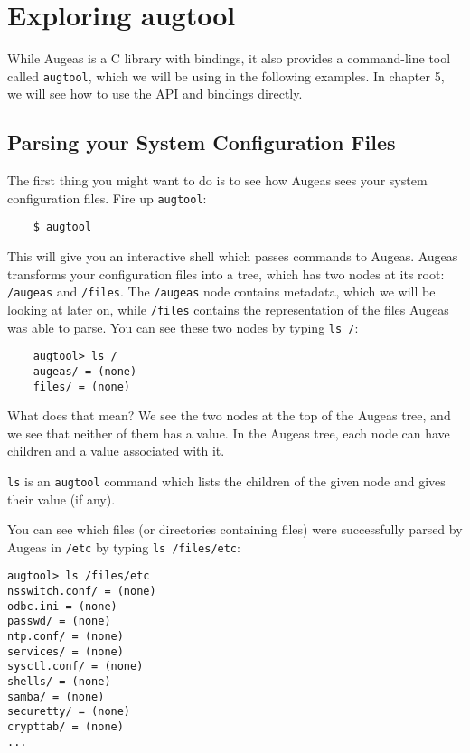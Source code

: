 \chapter{Exploring augtool}


While Augeas is a C library with bindings, it also provides a command-line tool called \verb!augtool!, which we will be using in the following examples. In chapter 5, we will see how to use the API and bindings directly.


\section{Parsing your System Configuration Files}

The first thing you might want to do is to see how Augeas sees your system configuration files. Fire up \verb!augtool!:

\begin{verbatim}
    $ augtool
\end{verbatim}


This will give you an interactive shell which passes commands to Augeas. Augeas transforms your configuration files into a tree, which has two nodes at its root: \verb!/augeas! and \verb!/files!. The \verb!/augeas! node contains metadata, which we will be looking at later on, while \verb!/files! contains the representation of the files Augeas was able to parse. You can see these two nodes by typing \verb!ls /!:

\begin{verbatim}
    augtool> ls /
    augeas/ = (none)
    files/ = (none)
\end{verbatim}

What does that mean? We see the two nodes at the top of the Augeas tree, and we see that neither of them has a value. In the Augeas tree, each node can have children and a value associated with it.

\verb!ls! is an \verb!augtool! command which lists the children of the given node and gives their value (if any).

You can see which files (or directories containing files) were successfully parsed by Augeas in \verb!/etc! by typing \verb!ls /files/etc!:

\begin{verbatim}
augtool> ls /files/etc
nsswitch.conf/ = (none)
odbc.ini = (none)
passwd/ = (none)
ntp.conf/ = (none)
services/ = (none)
sysctl.conf/ = (none)
shells/ = (none)
samba/ = (none)
securetty/ = (none)
crypttab/ = (none)
...
\end{verbatim}


